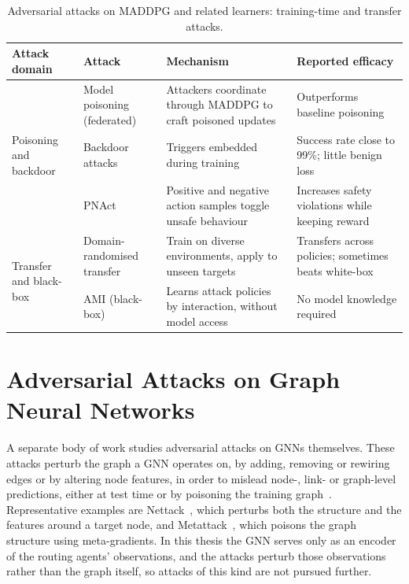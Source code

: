 \begin{table}[htbp]
\centering
\caption{Adversarial attacks on MADDPG and related learners: training-time and
         transfer attacks.}
\label{tab:maddpg_attacks2}
\begin{tabular}{|p{2.5cm}|p{3cm}|p{4cm}|p{3.5cm}|}
\hline
\textbf{Attack domain} & \textbf{Attack} & \textbf{Mechanism} & \textbf{Reported efficacy} \\
\hline
\multirow{3}{2.5cm}{Poisoning and backdoor} & Model poisoning (federated) & Attackers coordinate through MADDPG to craft poisoned updates & Outperforms baseline poisoning \\
\cline{2-4}
 & Backdoor attacks & Triggers embedded during training & Success rate close to 99\%; little benign loss \\
\cline{2-4}
 & PNAct & Positive and negative action samples toggle unsafe behaviour & Increases safety violations while keeping reward \\
\hline
\multirow{2}{2.5cm}{Transfer and black-box} & Domain-randomised transfer & Train on diverse environments, apply to unseen targets & Transfers across policies; sometimes beats white-box \\
\cline{2-4}
 & AMI (black-box) & Learns attack policies by interaction, without model access & No model knowledge required \\
\hline
\end{tabular}
\end{table}

\section{Adversarial Attacks on Graph Neural Networks}
\label{sec:gnn_attacks}

A separate body of work studies adversarial attacks on GNNs themselves. These attacks
perturb the graph a GNN operates on, by adding, removing or rewiring edges or by
altering node features, in order to mislead node-, link- or graph-level
predictions, either at test time or by poisoning the training
graph~\cite{luo2024survey,wei2020adversarial}. Representative examples are
Nettack~\cite{Nettack}, which perturbs both the structure and the features around a
target node, and Metattack~\cite{metaattackgnn}, which poisons the graph structure
using meta-gradients. In this thesis the GNN serves only as an encoder of the routing
agents' observations, and the attacks perturb those observations rather than the graph
itself, so attacks of this kind are not pursued further.


